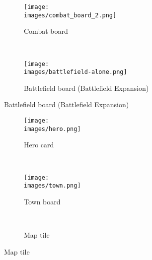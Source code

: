 
\begin{figure}[H]
	\centering
	\begin{subfigure}[b]{0.4\linewidth}
		\texttt{[image: \\images/combat\_board\_2.png]}
		\caption{\centering Combat board}
	\end{subfigure}
	~
	\begin{subfigure}[b]{0.5\linewidth}
		\texttt{[image: \\images/battlefield-alone.png]}
		\caption{\centering Battlefield board (Battlefield Expansion)}
	\end{subfigure}
\end{figure}
\vspace*{-2em}
\begin{figure}[H]
	\centering
	\begin{subfigure}[b]{0.3\linewidth}
		\texttt{[image: \\images/hero.png]}
		\caption{\centering Hero card}
	\end{subfigure}
	~
	\begin{subfigure}[b]{0.3\linewidth}
		\texttt{[image: \\images/town.png]}
		\caption{\centering Town board}
	\end{subfigure}
	~
	\begin{subfigure}[b]{0.3\linewidth}
		\centering
		\caption{\centering Map tile}
	\end{subfigure}
\end{figure}
\vspace*{-2em}
